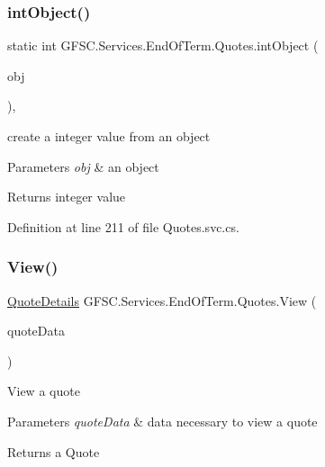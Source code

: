 \subsubsection{\texorpdfstring{int\+Object()}{intObject()}}
{\footnotesize\ttfamily static int G\+F\+S\+C.\+Services.\+End\+Of\+Term.\+Quotes.\+int\+Object (\begin{DoxyParamCaption}\item[{object}]{obj }\end{DoxyParamCaption})\hspace{0.3cm}{\ttfamily [static]}, {\ttfamily [private]}}



create a integer value from an object 


\begin{DoxyParams}{Parameters}
{\em obj} & an object\\
\hline
\end{DoxyParams}
\begin{DoxyReturn}{Returns}
integer value
\end{DoxyReturn}


Definition at line 211 of file Quotes.\+svc.\+cs.

\mbox{\label{class_g_f_s_c_1_1_services_1_1_end_of_term_1_1_quotes_a68db0939e495f84025bf01b6ef4fbc2a}} 
\subsubsection{\texorpdfstring{View()}{View()}}
{\footnotesize\ttfamily \mbox{\hyperlink{class_g_f_s_c_1_1_services_1_1_end_of_term_1_1_quote_details}{Quote\+Details}} G\+F\+S\+C.\+Services.\+End\+Of\+Term.\+Quotes.\+View (\begin{DoxyParamCaption}\item[{\mbox{\hyperlink{class_g_f_s_c_1_1_services_1_1_end_of_term_1_1_quote_view}{Quote\+View}}}]{quote\+Data }\end{DoxyParamCaption})}



View a quote 


\begin{DoxyParams}{Parameters}
{\em quote\+Data} & data necessary to view a quote\\
\hline
\end{DoxyParams}
\begin{DoxyReturn}{Returns}
a Quote
\end{DoxyReturn}


